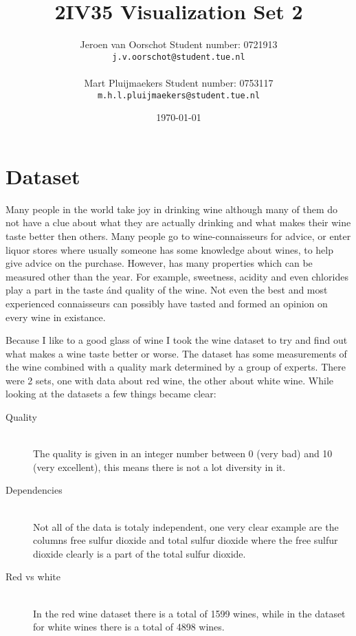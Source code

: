 \documentclass[a4paper,twoside,11pt]{article}
\title{\vspace{-\baselineskip}\sffamily\bfseries 2IV35 Visualization Set 2}
\author{Jeroen van Oorschot \qquad Student number: 0721913 \\{\tt j.v.oorschot@student.tue.nl}\\ \\Mart Pluijmaekers \qquad Student number: 0753117 \\{\tt m.h.l.pluijmaekers@student.tue.nl}}
\date{\today}
\begin{document}
\maketitle

\pagebreak
\tableofcontents
\newpage
\section{Dataset}
Many people in the world take joy in drinking wine although many of them do not have a clue about what they are actually drinking and what makes their wine taste better then others. Many people go to wine-connaisseurs for advice, or enter liquor stores where usually someone has some knowledge about wines, to help give advice on the purchase. However, has many properties which can be measured other than the year. For example, sweetness, acidity and even chlorides play a part in the taste \'and quality of the wine. Not even the best and most experienced connaisseurs can possibly have tasted and formed an opinion on every wine in existance. 


Because I like to a good glass of wine I took the wine dataset to try and find out what makes a wine taste better or worse. The dataset has some measurements of the wine combined with a quality mark determined by a group of experts. There were 2 sets, one with data about red wine, the other about white wine. While looking at the datasets a few things became clear:

\begin{description}
\item[Quality] \hfill \\ The quality is given in an integer number between 0 (very bad) and 10 (very excellent), this means there is not a lot diversity in it.
\item[Dependencies] \hfill \\ Not all of the data is totaly independent, one very clear example are the columns free sulfur dioxide and total sulfur dioxide where the free sulfur dioxide clearly is a part of the total sulfur dioxide.
\item[Red vs white] \hfill \\ In the red wine dataset there is a total of 1599 wines, while in the dataset for white wines there is a total of 4898 wines.
\end{description}
\end{document}
